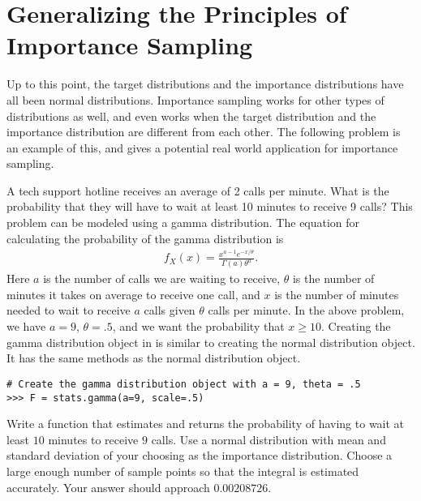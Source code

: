 \section*{Generalizing the Principles of Importance Sampling} %

Up to this point, the target distributions and the importance distributions have all been normal distributions.
Importance sampling works for other types of distributions as well, and even works when the target distribution and the importance distribution are different from each other.
The following problem is an example of this, and gives a potential real world application for importance sampling.

\begin{problem}
\label{prob:importsamp-gamma}
A tech support hotline receives an average of 2 calls per minute.
What is the probability that they will have to wait at least 10 minutes to receive 9 calls?
This problem can be modeled using a gamma distribution.
The equation for calculating the probability of the gamma distribution is
\begin{align}
f_X(x) = \frac{x^{a-1}e^{-x/\theta}}{\Gamma(a)\theta^a}.
\end{align}
Here $a$ is the number of calls we are waiting to receive, $\theta$ is the number of minutes it takes on average to receive one call, and $x$ is the number of minutes needed to wait to receive $a$ calls given $\theta$ calls per minute.
In the above problem, we have $a = 9$, $\theta = .5$, and we want the probability that $x \geq 10$.
Creating the gamma distribution object in  is similar to creating the normal distribution object.
It has the same methods as the normal distribution object.

\begin{lstlisting}
# Create the gamma distribution object with a = 9, theta = .5
>>> F = stats.gamma(a=9, scale=.5)
\end{lstlisting}

Write a function that estimates and returns the probability of having to wait at least $10$ minutes to receive $9$ calls.
Use a normal distribution with mean and standard deviation of your choosing as the importance distribution.
Choose a large enough number of sample points so that the integral is estimated accurately.
Your answer should approach $0.00208726$.
\end{problem}

